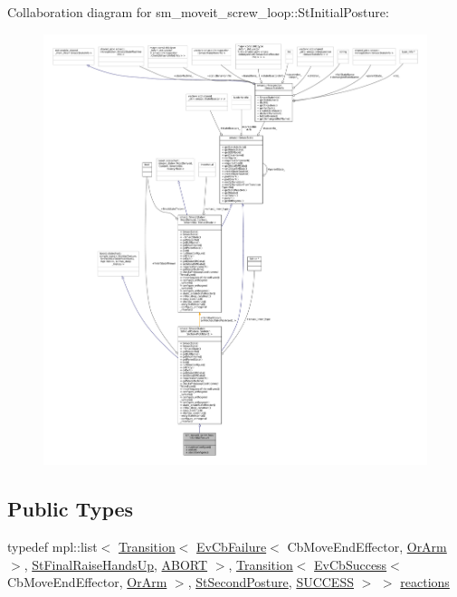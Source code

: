 Collaboration diagram for sm\+\_\+moveit\+\_\+screw\+\_\+loop\+:\+:St\+Initial\+Posture\+:
\nopagebreak
\begin{figure}[H]
\begin{center}
\leavevmode
\includegraphics[width=350pt]{structsm__moveit__screw__loop_1_1StInitialPosture__coll__graph}
\end{center}
\end{figure}
\subsection*{Public Types}
\begin{DoxyCompactItemize}
\item 
typedef mpl\+::list$<$ \hyperlink{classsmacc_1_1Transition}{Transition}$<$ \hyperlink{structsmacc_1_1EvCbFailure}{Ev\+Cb\+Failure}$<$ Cb\+Move\+End\+Effector, \hyperlink{classsm__moveit__screw__loop_1_1OrArm}{Or\+Arm} $>$, \hyperlink{structsm__moveit__screw__loop_1_1StFinalRaiseHandsUp}{St\+Final\+Raise\+Hands\+Up}, \hyperlink{structsmacc_1_1default__transition__tags_1_1ABORT}{A\+B\+O\+RT} $>$, \hyperlink{classsmacc_1_1Transition}{Transition}$<$ \hyperlink{structsmacc_1_1EvCbSuccess}{Ev\+Cb\+Success}$<$ Cb\+Move\+End\+Effector, \hyperlink{classsm__moveit__screw__loop_1_1OrArm}{Or\+Arm} $>$, \hyperlink{structsm__moveit__screw__loop_1_1StSecondPosture}{St\+Second\+Posture}, \hyperlink{structsmacc_1_1default__transition__tags_1_1SUCCESS}{S\+U\+C\+C\+E\+SS} $>$ $>$ \hyperlink{structsm__moveit__screw__loop_1_1StInitialPosture_a2544cded038cf7664377952d4b408d0d}{reactions}
\end{DoxyCompactItemize}
